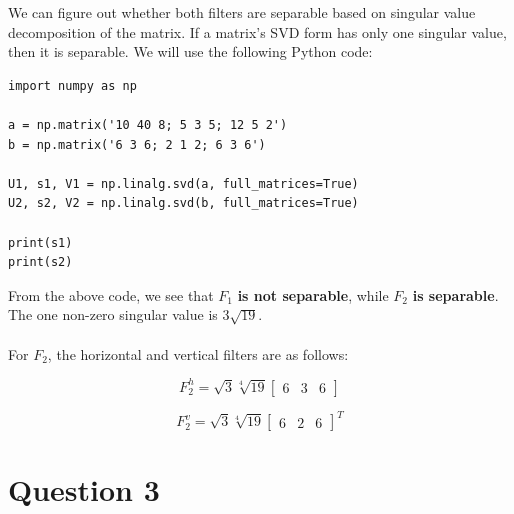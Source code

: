 \documentclass{article}
\begin{document}
We can figure out whether both filters are separable based on singular value decomposition of the matrix. If a matrix's SVD form has only one singular value, then it is separable. We will use the following Python code: 

\begin{lstlisting}
import numpy as np

a = np.matrix('10 40 8; 5 3 5; 12 5 2')
b = np.matrix('6 3 6; 2 1 2; 6 3 6')

U1, s1, V1 = np.linalg.svd(a, full_matrices=True)
U2, s2, V2 = np.linalg.svd(b, full_matrices=True)

print(s1)
print(s2)

\end{lstlisting}

\noindent
From the above code, we see that $F_1$ \textbf{is not separable}, while $F_2$ \textbf{is separable}. The one non-zero singular value is $3 \sqrt{19}$.
\\\\
\noindent
For $F_2$, the horizontal and vertical filters are as follows:

$$F_{2}^{h} = \sqrt{3} \sqrt[4]{19} \begin{bmatrix} 6 & 3 & 6 \end{bmatrix}$$

$$F_{2}^{v} = \sqrt{3} \sqrt[4]{19} \begin{bmatrix} 6 & 2 & 6 \end{bmatrix}^{T}$$

\section{Question 3}
\end{document}
